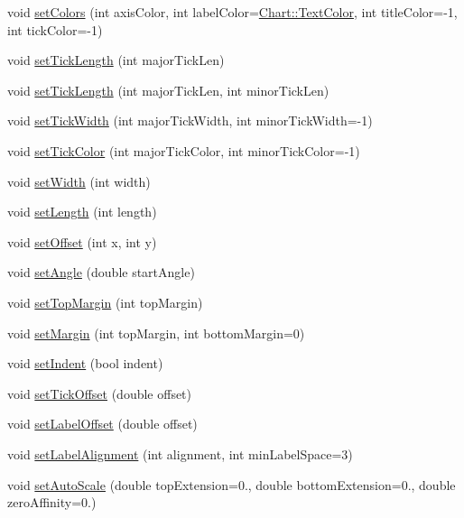 \begin{DoxyCompactItemize}
\item 
void \hyperlink{class_axis_a54d88ba3d4791b92a3efb757b3ea5c48}{set\+Colors} (int axis\+Color, int label\+Color=\hyperlink{namespace_chart_abee0d882fdc9ad0b001245ad9fc64011a879e14f2f5024caccc047374342321ef}{Chart\+::\+Text\+Color}, int title\+Color=-\/1, int tick\+Color=-\/1)
\item 
void \hyperlink{class_axis_aa74e4bc19a6a83b0f8dc6d3f815dd64e}{set\+Tick\+Length} (int major\+Tick\+Len)
\item 
void \hyperlink{class_axis_a80b7689e4f8ce5961937b9da00d9a5d7}{set\+Tick\+Length} (int major\+Tick\+Len, int minor\+Tick\+Len)
\item 
void \hyperlink{class_axis_a62799546985d8e3839515dacc54ffcdc}{set\+Tick\+Width} (int major\+Tick\+Width, int minor\+Tick\+Width=-\/1)
\item 
void \hyperlink{class_axis_acc8fbe608da1e15e4a434ef4d1814d18}{set\+Tick\+Color} (int major\+Tick\+Color, int minor\+Tick\+Color=-\/1)
\item 
void \hyperlink{class_axis_ab25fcf30198a480edcd5f2013d2376f1}{set\+Width} (int width)
\item 
void \hyperlink{class_axis_a975e48ae1b4d4d80e86f267f7272fd87}{set\+Length} (int length)
\item 
void \hyperlink{class_axis_a041e7ea566969e09175978fa4ae42406}{set\+Offset} (int x, int y)
\item 
void \hyperlink{class_axis_af2eb8f9d53b80736a336292d5a8ba0e9}{set\+Angle} (double start\+Angle)
\item 
void \hyperlink{class_axis_a05d760c8d314d23ba72ca69bf1382186}{set\+Top\+Margin} (int top\+Margin)
\item 
void \hyperlink{class_axis_a03b7110aeda343e1c17567741dc47a1d}{set\+Margin} (int top\+Margin, int bottom\+Margin=0)
\item 
void \hyperlink{class_axis_a906b0e90dca1e327107739ed120bec67}{set\+Indent} (bool indent)
\item 
void \hyperlink{class_axis_a5fa46a2ec10970e274f1d07e3f2754d7}{set\+Tick\+Offset} (double offset)
\item 
void \hyperlink{class_axis_ac032ffeb1b95640f0b15d8e87b4ba02a}{set\+Label\+Offset} (double offset)
\item 
void \hyperlink{class_axis_af739ec5f1ef674cec9d425505451096e}{set\+Label\+Alignment} (int alignment, int min\+Label\+Space=3)
\item 
void \hyperlink{class_axis_a1be77ee03032a57d8a032fa118821b74}{set\+Auto\+Scale} (double top\+Extension=0., double bottom\+Extension=0., double zero\+Affinity=0.)

\end{DoxyCompactItemize}

